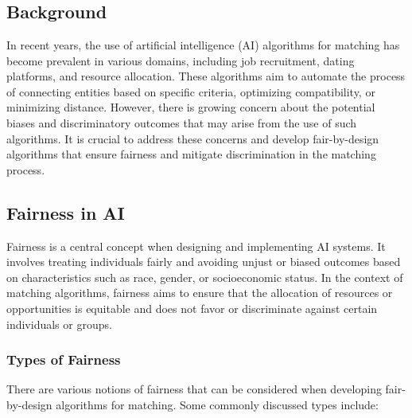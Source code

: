 \documentclass[12pt,a4paper,openright,twoside]{book}
\begin{document}
\tableofcontents   
\listoffigures     %
\lstlistoflistings %

\mainmatter

\chapter{\introductionname}
\label{chap:introduction}


\section{Background}
In recent years, the use of artificial intelligence (AI) algorithms for matching has become prevalent in various domains, including job recruitment, dating platforms, and resource allocation. These algorithms aim to automate the process of connecting entities based on specific criteria, optimizing compatibility, or minimizing distance. However, there is growing concern about the potential biases and discriminatory outcomes that may arise from the use of such algorithms. It is crucial to address these concerns and develop fair-by-design algorithms that ensure fairness and mitigate discrimination in the matching process.

\section{Fairness in AI}
Fairness is a central concept when designing and implementing AI systems. It involves treating individuals fairly and avoiding unjust or biased outcomes based on characteristics such as race, gender, or socioeconomic status. In the context of matching algorithms, fairness aims to ensure that the allocation of resources or opportunities is equitable and does not favor or discriminate against certain individuals or groups.

\subsection{Types of Fairness}
There are various notions of fairness that can be considered when developing fair-by-design algorithms for matching. Some commonly discussed types include:
\end{document}
